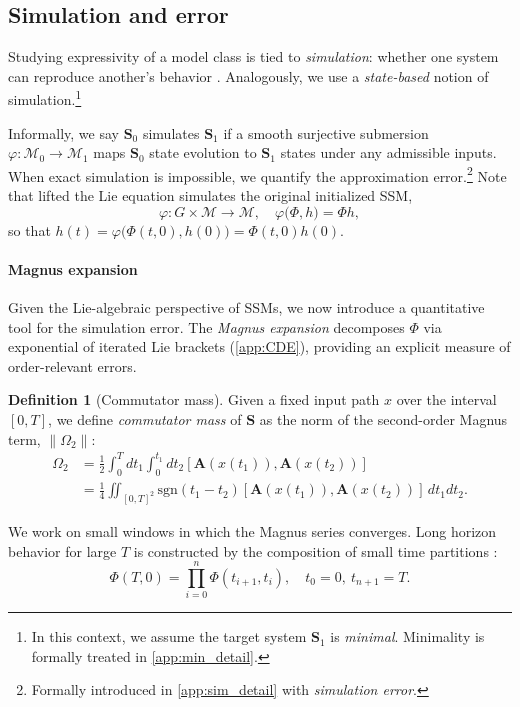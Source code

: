 \documentclass{article}
\theoremstyle{plain}
\theoremstyle{definition}
\newtheorem{definition}[theorem]{Definition}
\theoremstyle{remark}
\newcommand{\mcal}[1]{\mathcal{#1}}
\newcommand{\mbf}[1]{\mathbf{#1}}
\begin{document}
\subsection{Simulation and error}
\label{par:sim_min_main}
Studying expressivity of a model class is tied to \emph{simulation}:
whether one system can reproduce another's behavior \cite{liu2022transformers}.
Analogously, we use a \emph{state-based} notion of simulation.\footnote{
In this context, we assume the target system $\mbf{S}_1$ is \emph{minimal}.
Minimality is formally treated in \cref{app:min_detail}.}

Informally, we say $\mbf{S}_0$ simulates $\mbf{S}_1$
if a smooth surjective submersion $\varphi: \mcal{M}_0 \to \mcal{M}_1$ maps
$\mbf{S}_0$ state evolution to $\mbf{S}_1$ states under any admissible inputs.
When exact simulation is impossible, we quantify the approximation error.\footnote{
Formally introduced in \cref{app:sim_detail} with \emph{simulation error}.}
Note that lifted the Lie equation simulates the original initialized SSM,
\begin{equation}
\label{eq:flow_to_state_submersion}
    \varphi: G \times \mcal{M} \to \mcal{M},
    \quad
    \varphi\bigl( \Phi, h \bigr) = \Phi h,
\end{equation}
so that $h(t) = \varphi\bigl( \Phi(t,0), h(0) \bigr) = \Phi(t,0)h(0)$.
\paragraph{Magnus expansion}
\label{par:MagnusExpansion}
Given the Lie-algebraic perspective of SSMs,
we now introduce a quantitative tool for the simulation error.
The \emph{Magnus expansion} decomposes $\Phi$ via exponential of
iterated Lie brackets (\cref{app:CDE}),
providing an explicit measure of order-relevant errors.
\begin{definition}[Commutator mass]
\label{def:commutator_mass}
    Given a fixed input path $x$ over the interval $[0,T]$,
    we define \emph{commutator mass} of $\mbf{S}$
    as the norm of the second-order Magnus term, $\|\Omega_2\|$:
    \begin{align}
    \label{eq:omega_2}
        \Omega_2
        &= \frac{1}{2}
        \int_0^T dt_1
        \int_0^{t_1} dt_2
        [\mbf{A}(x(t_1)), \mbf{A}(x(t_2))]
        \\
        &= \frac{1}{4}\iint_{[0,T]^2}
        \text{sgn}(t_1 - t_2)
        [\mathbf{A}(x(t_1)), \mathbf{A}(x(t_2))]
        \, dt_1 dt_2. \nonumber
    \end{align}
\end{definition}
We work on small windows in which the Magnus series converges.
Long horizon behavior for large $T$ is constructed by the composition of small time partitions \cite{sontag2013mathematical}:
\begin{equation}
\label{eq:flow_composition}
    \Phi(T,0) = \prod_{i=0}^n \Phi(t_{i+1}, t_i),
    \quad
    t_0=0,
    \
    t_{n+1}=T.
\end{equation}
\end{document}
